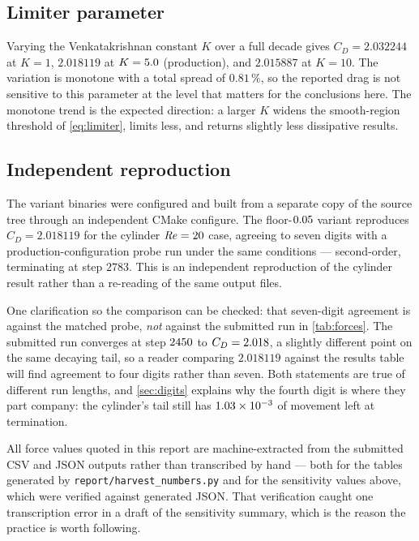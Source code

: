 \subsection{Limiter parameter}
\label{sec:limitersens}

Varying the Venkatakrishnan constant $K$ over a full decade gives
$C_D=\num{2.032244}$ at $K=1$, $\num{2.018119}$ at $K=5.0$ (production), and
$\num{2.015887}$ at $K=10$. The variation is monotone with a total spread of
$0.81\,\%$, so the reported drag is not sensitive to this parameter at the level
that matters for the conclusions here. The monotone trend is the expected
direction: a larger $K$ widens the smooth-region threshold of
\cref{eq:limiter}, limits less, and returns slightly less dissipative results.

\subsection{Independent reproduction}
\label{sec:reproduction}

The variant binaries were configured and built from a separate copy of the source
tree through an independent CMake configure. The floor-$0.05$ variant
reproduces $C_D=\num{2.018119}$ for the cylinder $\mathit{Re}=20$ case, agreeing to seven digits
with a production-configuration probe run under the same conditions --- second-order,
terminating at step $2783$. This is an independent reproduction of the cylinder result
rather than a re-reading of the same output files.

One clarification so the comparison can be checked: that seven-digit agreement is against
the matched probe, \emph{not} against the submitted run in \cref{tab:forces}. The submitted
run converges at step $\num{2450}$ to $C_D=\num{2.018}$, a slightly different
point on the same decaying tail, so a reader comparing $2.018119$ against the results table
will find agreement to four digits rather than seven. Both statements are true of different
run lengths, and \cref{sec:digits} explains why the fourth digit is where they part company:
the cylinder's tail still has $\num{1.03e-03}$ of movement left at termination.

All force values quoted in this report are machine-extracted from the submitted
CSV and JSON outputs rather than transcribed by hand --- both for the tables
generated by \texttt{report/harvest\_numbers.py} and for the sensitivity values
above, which were verified against generated JSON. That verification caught one
transcription error in a draft of the sensitivity summary, which is the reason the
practice is worth following.
